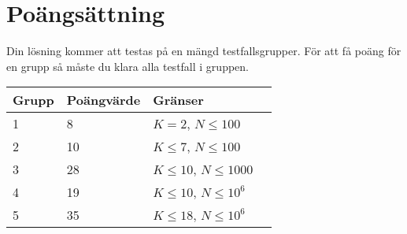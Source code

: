 \section*{Poängsättning}
Din lösning kommer att testas på en mängd testfallsgrupper. För att få poäng för en grupp
så måste du klara alla testfall i gruppen.

\noindent
\begin{tabular}{| l | l | l | l |}
\hline
Grupp & Poängvärde & Gränser \\ \hline
	1     & 8 & $K = 2$, $N \le 100$ \\ \hline
	2     & 10 & $K \le 7$, $N \le 100$ \\ \hline
	3     & 28 & $K \le 10$, $N \le 1000$ \\ \hline
	4     & 19 & $K \le 10$, $N \le 10^6$ \\ \hline
	5     & 35 & $K \le 18$, $N \le 10^6$ \\ \hline
\end{tabular}
